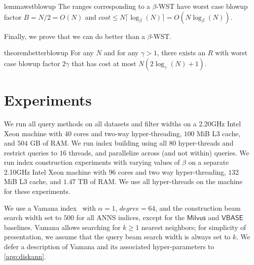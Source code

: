 \documentclass{article}
\newcommand{\myparagraph}[1]{\smallskip\noindent {\bf #1.}}
\theoremstyle{plain}
\theoremstyle{definition}
\theoremstyle{remark}
\newcommand{\ben}[1]{{\color{purple}{\bf Ben:} #1}}
\newcommand{\degree}{\ensuremath{\textit{degree}}}
\newcommand{\algname}[1]{\ensuremath{\mathsf{#1}}}
\begin{document}
\begin{restatable}{lemma}{wstblowup}
\label{lem:wstblowup}
The ranges corresponding to a $\beta$-WST have worst case blowup factor $B = N / 2 = O(N)$ and  $cost \le N\lceil \log_\beta(N) \rceil = O(N\log_\beta(N))$. 
\end{restatable}

Finally, we prove that we can do better than a $\beta$-WST.

\begin{restatable}{theorem}{betterblowup}
\label{thm:betterblowup}
For any $N$ and for any $\gamma > 1$, there exists an $R$ with worst case blowup factor $2\gamma$ that has cost at most $N\left(2\log_\gamma(N) + 1\right)$.
\end{restatable}





\section{Experiments}


\myparagraph{Experiment Setup}
We run all query methods on all datasets and filter widths on a 2.20GHz Intel Xeon machine with $40$ cores and two-way hyper-threading, $100$ MiB L3 cache, and $504$ GB of RAM. 
We run index building using all $80$ hyper-threads and restrict queries to $16$ threads, and parallelize across (and not within) queries.  
We run index construction experiments with varying values of $\beta$ on a separate 2.10GHz %
Intel Xeon machine with $96$ cores and two way hyper-threading, $132$ MiB L3 cache, and $1.47$ TB of RAM. We use all hyper-threads on the machine for these experiments.

We use a Vamana index~\cite{diskann} with $\alpha = 1$, $\degree{} = 64$, and the construction beam search width set to $500$ for all ANNS indices, except for the \algname{Milvus} and \algname{VBASE} baselines. Vamana allows searching for $k \ge 1$ nearest neighbors; for simplicity of presentation, we assume that the query beam search width is always set to $k$. We defer a description of Vamana and its associated hyper-parameters to \cref{app:diskann}.
\end{document}
